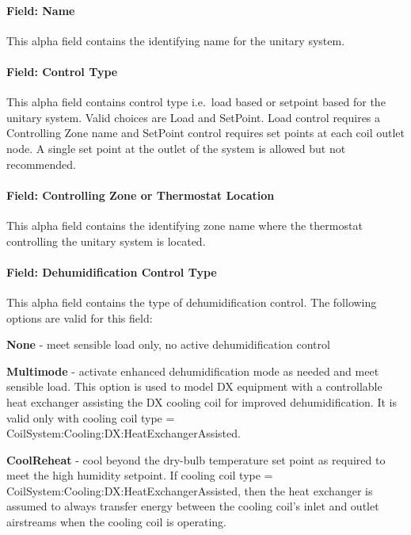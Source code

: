 \paragraph{Field: Name}\label{field-name-048}

This alpha field contains the identifying name for the unitary system.

\paragraph{Field: Control Type}\label{field-control-type-004}

This alpha field contains control type i.e.~load based or setpoint based for the unitary system. Valid choices are Load and SetPoint. Load control requires a Controlling Zone name and SetPoint control requires set points at each coil outlet node. A single set point at the outlet of the system is allowed but not recommended.

\paragraph{Field: Controlling Zone or Thermostat Location}\label{field-controlling-zone-or-thermostat-location}

This alpha field contains the identifying zone name where the thermostat controlling the unitary system is located.

\paragraph{Field: Dehumidification Control Type}\label{field-dehumidification-control-type-001}

This alpha field contains the type of dehumidification control. The following options are valid for this field:

\textbf{None} - meet sensible load only, no active dehumidification control

\textbf{Multimode} - activate enhanced dehumidification mode as needed and meet sensible load. This option is used to model DX equipment with a controllable heat exchanger assisting the DX cooling coil for improved dehumidification. It is valid only with cooling coil type = CoilSystem:Cooling:DX:HeatExchangerAssisted.

\textbf{CoolReheat} - cool beyond the dry-bulb temperature set point as required to meet the high humidity setpoint. If cooling coil type = CoilSystem:Cooling:DX:HeatExchangerAssisted, then the heat exchanger is assumed to always transfer energy between the cooling coil's inlet and outlet airstreams when the cooling coil is operating.

